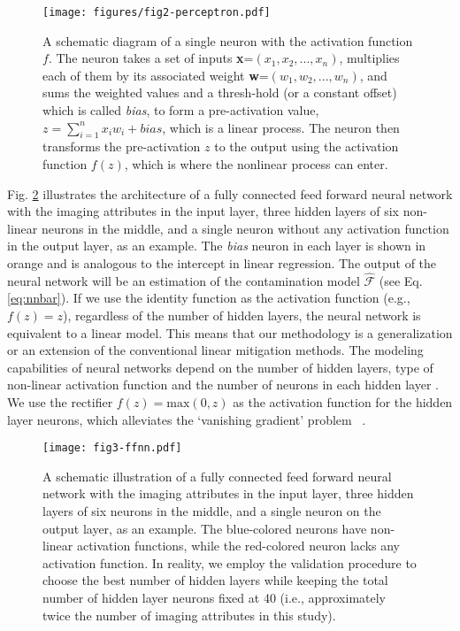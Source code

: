 \begin{figure}
\centering
\texttt{[image: figures/fig2-perceptron.pdf]}
\caption{A schematic diagram of a single neuron with the activation function $f$. The neuron takes a set of inputs \textbf{x}=$(x_{1}, x_{2},...,x_{n})$, multiplies each of them by its associated weight \textbf{w}=$(w_{1}, w_{2},...,w_{n})$, and sums the weighted values and a thresh-hold (or a constant offset) which is called \textit{bias}, to form a pre-activation value, $z=\sum_{i=1}^{n}x_{i}w_{i} + bias$, which is a linear process. The neuron then transforms the pre-activation $z$ to the output using the activation function $f(z)$, which is where the nonlinear process can enter. }\label{fig:perceptron}
\end{figure}

Fig. \ref{fig:ffnn} illustrates the architecture of a fully connected feed forward neural network with the imaging attributes in the input layer, three hidden layers of six non-linear neurons in the middle, and a single neuron without any activation function in the output layer, as an example. The \textit{bias} neuron in each layer is shown in orange and is analogous to the intercept in linear regression. The output of the neural network will be an estimation of the contamination model $\hat{\mathcal{F}}$ (see Eq. \ref{eq:nnbar}). If we use the identity function as the activation function (e.g., $f(z)=z$), regardless of the number of hidden layers, the neural network is equivalent to a linear model. This means that our methodology is a generalization or an extension of the conventional linear mitigation methods. The modeling capabilities of neural networks depend on the number of hidden layers, type of non-linear activation function and the number of neurons in each hidden layer \citep[see e.g.][]{cybenko1989approximation,hornik1989multilayer,funahashi1989approximate, tamura1997capabilities, huang2003learning, lin2017does, rolnick2017power}.\\

We use the rectifier $f(z) = \text{max}(0, z)$ as the activation function for the hidden layer neurons, which alleviates the `vanishing gradient' problem
~\citep[see e.g.,][]{nair2010rectified,glorot2011deep,krizhevsky2012imagenet, dahl2013improving,montufar2014number}. \\

\begin{figure}
\centering
\texttt{[image: fig3-ffnn.pdf]}
\caption{A schematic illustration of a fully connected feed forward neural network with the imaging attributes in the input layer, three hidden layers of six neurons in the middle, and a single neuron on the output layer, as an example. The blue-colored neurons have non-linear activation functions, while the red-colored neuron lacks any activation function. In reality, we employ the validation procedure to choose the best number of hidden layers while keeping the total number of hidden layer neurons fixed at 40 (i.e., approximately twice the number of imaging attributes in this study).}\label{fig:ffnn}
\end{figure}

